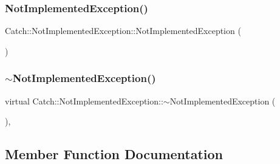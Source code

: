 \hypertarget{class_catch_1_1_not_implemented_exception_a508a7a833455da2d3c10ea1a9d45e982}{}\label{class_catch_1_1_not_implemented_exception_a508a7a833455da2d3c10ea1a9d45e982} 
\subsubsection{\texorpdfstring{Not\+Implemented\+Exception()}{NotImplementedException()}\hspace{0.1cm}{\footnotesize\ttfamily [2/2]}}
{\footnotesize\ttfamily Catch\+::\+Not\+Implemented\+Exception\+::\+Not\+Implemented\+Exception (\begin{DoxyParamCaption}\item[{\hyperlink{class_catch_1_1_not_implemented_exception}{Not\+Implemented\+Exception} const \&}]{ }\end{DoxyParamCaption})\hspace{0.3cm}{\ttfamily [inline]}}

\hypertarget{class_catch_1_1_not_implemented_exception_a557e7312aaa32c37bded019f2b059bcb}{}\label{class_catch_1_1_not_implemented_exception_a557e7312aaa32c37bded019f2b059bcb} 
\subsubsection{\texorpdfstring{$\sim$\+Not\+Implemented\+Exception()}{~NotImplementedException()}}
{\footnotesize\ttfamily virtual Catch\+::\+Not\+Implemented\+Exception\+::$\sim$\+Not\+Implemented\+Exception (\begin{DoxyParamCaption}{ }\end{DoxyParamCaption})\hspace{0.3cm}{\ttfamily [inline]}, {\ttfamily [virtual]}}



\subsection{Member Function Documentation}
\hypertarget{class_catch_1_1_not_implemented_exception_ad4c13963f1a8feacda0cd331adda89e3}{}\label{class_catch_1_1_not_implemented_exception_ad4c13963f1a8feacda0cd331adda89e3} 

